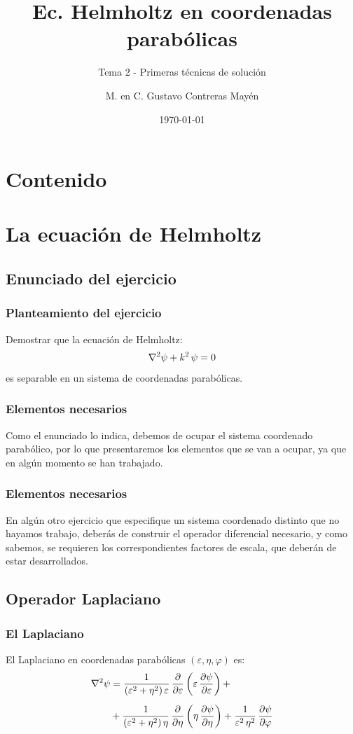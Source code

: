 \documentclass[12pt]{beamer}
\date{\today}
\title{\large{Ec. Helmholtz en coordenadas parabólicas}}
\subtitle{Tema 2 - Primeras técnicas de solución}
\author{M. en C. Gustavo Contreras Mayén}
\begin{document}
\maketitle
\fontsize{14}{14}\selectfont
{}

\section*{Contenido}

\section{La ecuación de Helmholtz}
\subsection{Enunciado del ejercicio}

\begin{frame}
\frametitle{Planteamiento del ejercicio}
Demostrar que la ecuación de Helmholtz:
\begin{align}
\laplacian{\psi} + k^{2} \, \psi = 0
\label{eq:ecuacion_Helmholtz}
\end{align}
es separable en un sistema de coordenadas parabólicas.
\end{frame}
\begin{frame}
\frametitle{Elementos necesarios}
Como el enunciado lo indica, debemos de ocupar el sistema coordenado parabólico, \pause por lo que presentaremos los elementos que se van a ocupar, ya que en algún momento se han trabajado.
\end{frame}
\begin{frame}
\frametitle{Elementos necesarios}
En algún otro ejercicio que especifique un sistema coordenado distinto que no hayamos trabajo, deberás de construir el operador diferencial necesario, y como sabemos, se requieren los correspondientes factores de escala, que deberán de estar desarrollados.
\end{frame}

\subsection{Operador Laplaciano}

\begin{frame}
\frametitle{El Laplaciano}
El Laplaciano en coordenadas parabólicas $(\varepsilon, \eta, \varphi)$ es:
\begin{align*}
\laplacian{\psi} &= \dfrac{1}{(\varepsilon^{2} + \eta^{2}) \, \varepsilon} \, \pdv{\varepsilon} \left( \varepsilon \, \pdv{\psi}{\varepsilon} \right) + \\[0.5em]
&+ \dfrac{1}{(\varepsilon^{2} + \eta^{2}) \, \eta} \, \pdv{\eta} \left( \eta \, \pdv{\psi}{\eta} \right) + \dfrac{1}{\varepsilon^{2} \, \eta^{2}} \, \pdv{\psi}{\varphi}
\end{align*}
\end{frame}
\end{document}
